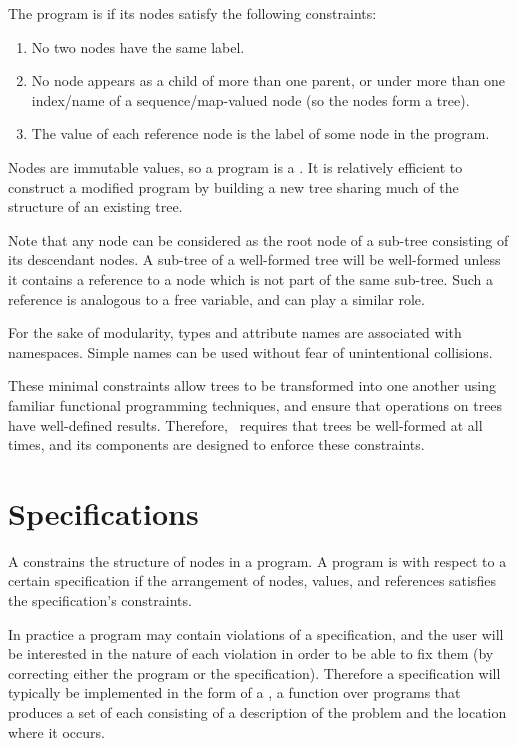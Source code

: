 The program is  if its nodes satisfy the following constraints:
\begin{enumerate}
\item No two nodes have the same label.
\item No node appears as a child of more than one parent, or under more than one index/name of a sequence/map-valued node (so the nodes form a tree).
\item The value of each reference node is the label of some node in the program.
\end{enumerate}

Nodes are immutable values, so a program is a  \cite{sarnak}. It is relatively efficient to construct a modified program by building a new tree sharing much of the structure of an existing tree.

Note that any node can be considered as the root node of a sub-tree consisting of its descendant nodes. A sub-tree of a well-formed tree will be well-formed unless it contains a  reference to a node which is not part of the same sub-tree. Such a reference is analogous to a free variable, and can play a similar role.

For the sake of modularity, types and attribute names are associated with namespaces. Simple names can be used without fear of unintentional collisions.

These minimal constraints allow trees to be transformed into one another using familiar functional programming techniques, and ensure that operations on trees have well-defined results. Therefore, \Meta\ requires that trees be well-formed at all times, and its components are designed to enforce these constraints.


\section{Specifications}
A  constrains the structure of nodes in a program. A program is  with respect to a certain specification if the arrangement of nodes, values, and references satisfies the specification's constraints.

In practice a program may contain violations of a specification, and the user will be interested in the nature of each violation in order to be able to fix them (by correcting either the program or the specification). Therefore a specification will typically be implemented in the form of a , a function over programs that produces a set of  each consisting of a description of the problem and the location where it occurs.

